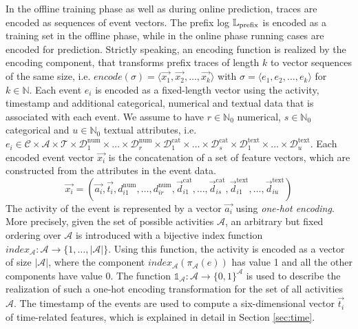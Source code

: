 In the offline training phase as well as during online prediction, traces are encoded as sequences of event vectors.
The prefix log $\mathbb{L}_\mathrm{prefix}$ is encoded as a training set in the offline phase, while in the online phase running cases are encoded for prediction.
Strictly speaking, an encoding function is realized by the encoding component, that transforms prefix traces of length $k$ to vector sequences of the same size, i.e. $encode(\sigma) = \langle \vec{x_1}, \vec{x_2}, \dots, \vec{x_k}\rangle$ with $\sigma = \langle e_1, e_2, \dots, e_k\rangle$ for $k \in \mathbb{N}$.
Each event $e_i$ is encoded as a fixed-length vector using the activity, timestamp and additional categorical, numerical and textual data that is associated with each event.
We assume to have $r \in \mathbb{N}_0$ numerical, $s \in \mathbb{N}_0$ categorical and $u \in \mathbb{N}_0$ textual attributes, i.e. $e_i \in \mathcal{C} \times \mathcal{A}  \times \mathcal{T} \times \mathcal{D}_1^\mathrm{num} \times \dots \times \mathcal{D}_r^\mathrm{num}   \times \mathcal{D}_1^\mathrm{cat}  \times  \dots  \times \mathcal{D}_s^\mathrm{cat}   \times \mathcal{D}_1^\mathrm{text}   \times \dots  \times \mathcal{D}_u^\mathrm{text}$.
Each encoded event vector $\vec{x_i}$ is the concatenation of a set of feature vectors, which are constructed from the attributes in the event data.
\begin{equation*}
\vec{x_i}=(
\vec{a_i},
\vec{t_i},
d_{i1}^\mathrm{num}, \dots, d_{ir}^\mathrm{num},
\vec{d}_{i1}^\mathrm{cat}, \dots,\vec{d}_{is}^\mathrm{cat},
\vec{d}_{i1}^\mathrm{text}, \dots, \vec{d}_{iu}^\mathrm{text})
\end{equation*}
The activity of the event is represented by a vector $\vec{a_i}$ using \textit{one-hot encoding}.
More precisely, given the set of possible activities $\mathcal{A}$, an arbitrary but fixed ordering over $\mathcal{A}$ is introduced with a bijective index function $index_\mathcal{A} \colon \mathcal{A} \to \{1, \dots, |\mathcal{A}|\}$.
Using this function, the activity is encoded as a vector of size $|\mathcal{A}|$, where the component $index_\mathcal{A}(\pi_\mathcal{A}(e))$ has value 1 and all the other components have value 0.
The function $\mathds{1}_\mathcal{A}\colon \mathcal{A} \to \{0,1\}^\mathcal{A}$ is used to describe the realization of such a one-hot encoding transformation for the set of all activities $\mathcal{A}$.
The timestamp of the events are used to compute a six-dimensional vector $\vec{t_i}$ of time-related features, which is explained in detail in Section \ref*{sec:time}.

